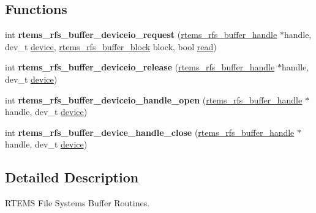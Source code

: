 \subsection*{Functions}
\begin{DoxyCompactItemize}
\item 
\mbox{\label{rtems-rfs-buffer-devio_8c_a3bd2fb78268edcea9879be6d202a2427}} 
int {\bfseries rtems\+\_\+rfs\+\_\+buffer\+\_\+deviceio\+\_\+request} (\mbox{\hyperlink{rtems-rfs-buffer_8h_a17f97c37c5273ad28d413dfd2d175e23}{rtems\+\_\+rfs\+\_\+buffer\+\_\+handle}} $\ast$handle, dev\+\_\+t \mbox{\hyperlink{structdevice}{device}}, \mbox{\hyperlink{rtems-rfs-buffer_8h_a5650d53328a5af0a78198fe780aec043}{rtems\+\_\+rfs\+\_\+buffer\+\_\+block}} block, bool \mbox{\hyperlink{libcsupport_2src_2read_8c_a26d4711c05afec4c7771c3d17b2db9e9}{read}})
\item 
\mbox{\label{rtems-rfs-buffer-devio_8c_aa28f967d445950e809a524d50b4fd645}} 
int {\bfseries rtems\+\_\+rfs\+\_\+buffer\+\_\+deviceio\+\_\+release} (\mbox{\hyperlink{rtems-rfs-buffer_8h_a17f97c37c5273ad28d413dfd2d175e23}{rtems\+\_\+rfs\+\_\+buffer\+\_\+handle}} $\ast$handle, dev\+\_\+t \mbox{\hyperlink{structdevice}{device}})
\item 
\mbox{\label{rtems-rfs-buffer-devio_8c_a1b4f8e82b7e84b565620cd814f6278c4}} 
int {\bfseries rtems\+\_\+rfs\+\_\+buffer\+\_\+deviceio\+\_\+handle\+\_\+open} (\mbox{\hyperlink{rtems-rfs-buffer_8h_a17f97c37c5273ad28d413dfd2d175e23}{rtems\+\_\+rfs\+\_\+buffer\+\_\+handle}} $\ast$handle, dev\+\_\+t \mbox{\hyperlink{structdevice}{device}})
\item 
\mbox{\label{rtems-rfs-buffer-devio_8c_a13d2c02c28d9159d1f1babf3b1d6c301}} 
int {\bfseries rtems\+\_\+rfs\+\_\+buffer\+\_\+device\+\_\+handle\+\_\+close} (\mbox{\hyperlink{rtems-rfs-buffer_8h_a17f97c37c5273ad28d413dfd2d175e23}{rtems\+\_\+rfs\+\_\+buffer\+\_\+handle}} $\ast$handle, dev\+\_\+t \mbox{\hyperlink{structdevice}{device}})
\end{DoxyCompactItemize}


\subsection{Detailed Description}
R\+T\+E\+MS File Systems Buffer Routines. 



